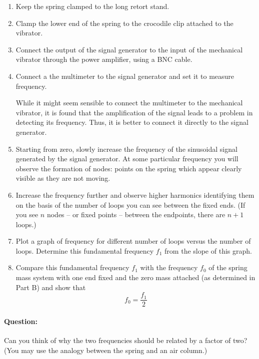 \begin{enumerate}
\item Keep the spring clamped to the long retort stand.

\item Clamp the lower end of the spring to the crocodile clip attached to the vibrator.

\item Connect the output of the signal generator to the input of the mechanical vibrator through the power amplifier, using a BNC cable.

\item Connect a the multimeter to the signal generator and set it to measure frequency.

\begin{tip}
While it might seem sensible to connect the multimeter to the mechanical vibrator, it is found that the amplification of the signal leads to a problem in detecting its frequency. Thus, it is better to connect it directly to the signal generator.
\end{tip}

\item Starting from zero, slowly increase the frequency of the sinusoidal signal generated by the signal generator. At some particular frequency you will observe the formation of nodes: points on the spring which appear clearly visible as they are not moving.

\item Increase the frequency further and observe higher harmonics identifying them on the basis of the number of loops you can see between the fixed ends. (If you see $n$ nodes -- or fixed points -- between the endpoints, there are $n+1$ loops.)

\item Plot a graph of frequency for different number of loops versus the number of loops. Determine this fundamental frequency $f_1$ from the slope of this graph.

\item Compare this fundamental frequency $f_1$ with the frequency $f_0$ of the spring mass
system with one end fixed and the zero mass attached (as determined in Part B) and
show that $$f_0 = \frac{f_1}{2}$$
\end{enumerate}

\begin{question}
\paragraph{Question:} Can you think of why the two frequencies should be related by a factor of two? (You may use the analogy between the spring and an air column.)
\end{question}


